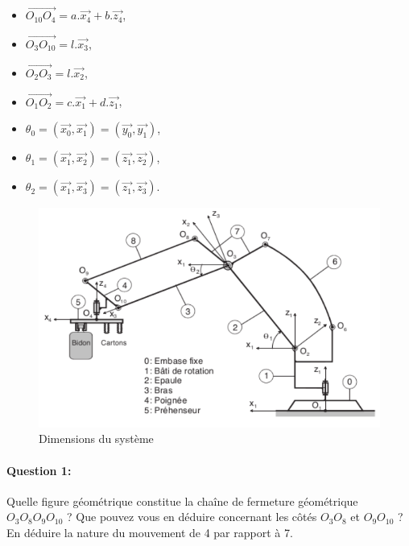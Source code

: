  \begin{minipage}{0.5\linewidth}
\begin{itemize}
 \item $\overrightarrow{O_{10}O_4}=a.\overrightarrow{x_4}+b.\overrightarrow{z_4}$,
 \item $\overrightarrow{O_3O_{10}}=l.\overrightarrow{x_3}$,
 \item $\overrightarrow{O_2O_3}=l.\overrightarrow{x_2}$,
 \item $\overrightarrow{O_1O_2}=c.\overrightarrow{x_1}+d.\overrightarrow{z_1}$,
\end{itemize} 
 \end{minipage} \hfill
 \begin{minipage}{0.5\linewidth}
\begin{itemize}
 \item $\theta_0=(\overrightarrow{x_0},\overrightarrow{x_1})=(\overrightarrow{y_0},\overrightarrow{y_1})$,
 \item $\theta_1=(\overrightarrow{x_1},\overrightarrow{x_2})=(\overrightarrow{z_1},\overrightarrow{z_2})$,
 \item $\theta_2=(\overrightarrow{x_1},\overrightarrow{x_3})=(\overrightarrow{z_1},\overrightarrow{z_3})$.
\end{itemize}
 \end{minipage}


\begin{figure}[!h]
  \centering\includegraphics[width=0.9\linewidth]{img/annexe_robot}
  \caption{Dimensions du système}
  \label{img:image104}
\end{figure}


\paragraph{Question 1:} Quelle figure géométrique constitue la chaîne de fermeture géométrique $O_3O_8O_9O_{10}$ ? Que pouvez vous en déduire concernant les côtés $O_3O_8$ et $O_9O_{10}$ ? En déduire la nature du mouvement de 4 par rapport à 7.

